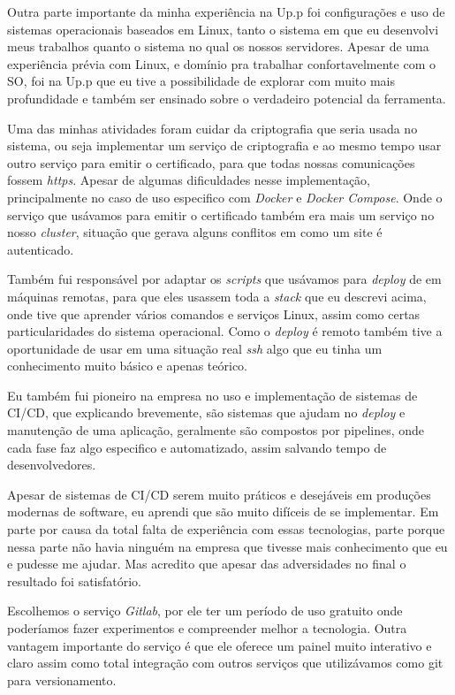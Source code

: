 \documentclass{ufscar}
\begin{document}
Outra parte importante da minha experiência na Up.p foi configurações e uso de sistemas operacionais baseados em Linux, tanto o sistema em que eu desenvolvi meus trabalhos quanto o sistema no qual os nossos servidores. Apesar de uma experiência prévia com Linux, e domínio pra trabalhar confortavelmente com o SO, foi na Up.p que eu tive a possibilidade de explorar com muito mais profundidade e também ser ensinado sobre o verdadeiro potencial da ferramenta.

Uma das minhas atividades foram cuidar da criptografia que seria usada no sistema, ou seja implementar um serviço de criptografia e ao mesmo tempo usar outro serviço para emitir o certificado, para que todas nossas comunicações fossem \textit{https}. Apesar de algumas dificuldades nesse implementação, principalmente no caso de uso especifico com \textit{Docker} e \textit{Docker Compose}. Onde o serviço que usávamos para emitir o certificado também era mais um serviço no nosso \textit{cluster}, situação que gerava alguns conflitos em como um site é autenticado.

Também fui responsável por adaptar os \textit{scripts} que usávamos para \textit{deploy} de em máquinas remotas, para que eles usassem toda a \textit{stack} que eu descrevi acima, onde tive que aprender vários comandos e serviços Linux, assim como certas particularidades do sistema operacional. Como o \textit{deploy} é remoto também tive a oportunidade de usar em uma situação real  \textit{ssh} algo que eu tinha um conhecimento muito básico e apenas teórico. 

Eu também fui pioneiro na empresa no uso e implementação de sistemas de CI/CD, que explicando brevemente, são sistemas que ajudam no \textit{deploy} e manutenção de uma aplicação, geralmente são compostos por pipelines, onde cada fase faz algo especifico e automatizado, assim salvando tempo de desenvolvedores.

Apesar de sistemas de CI/CD serem muito práticos e desejáveis em produções modernas de software, eu aprendi que são muito difíceis de se implementar. Em parte por causa da total falta de experiência com essas tecnologias, parte porque nessa parte não havia ninguém na empresa que tivesse mais conhecimento que eu e pudesse me ajudar. Mas acredito que apesar das adversidades no final o resultado foi satisfatório.

Escolhemos o serviço \textit{Gitlab}, por ele ter um período de uso gratuito onde poderíamos fazer experimentos e compreender melhor a tecnologia. Outra vantagem importante do serviço é que ele oferece um painel muito interativo e claro assim como total integração com outros serviços que utilizávamos como git para versionamento.
\end{document}
